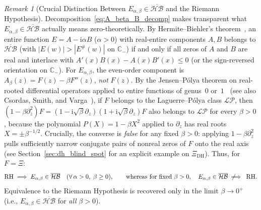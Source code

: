 \documentclass[11pt,reqno]{amsart}
\theoremstyle{definition}
\theoremstyle{remark}
\newtheorem{remark}[theorem]{Remark}
\numberwithin{equation}{section}
\newcommand{\C}{\mathbb{C}}
\newcommand{\ii}{\mathrm{i}}
\begin{document}
\begin{remark}[Crucial Distinction Between $E_{\alpha,\beta} \in \overline{\mathcal{HB}}$ and the Riemann Hypothesis]\label{rem:hb_weaker_than_rh}
Decomposition~\eqref{eq:A_beta_B_decomp} makes transparent what $E_{\alpha,\beta} \in \overline{\mathcal{HB}}$ actually means zero-theoretically. By Hermite--Biehler's theorem~\cite[Chapter~1]{debranges1968}, an entire function $E = A - \ii\alpha B$ ($\alpha > 0$) with real-entire components $A, B$ belongs to $\overline{\mathcal{HB}}$ (with $|E(w)| > |E^\#(w)|$ on $\C_-$) if and only if all zeros of $A$ and $B$ are real and interlace with $A'(x)B(x) - A(x)B'(x) \le 0$ (or the sign-reversed orientation on $\C_-$). For $E_{\alpha,\beta}$, the even-order component is $A_\beta(z) = F(z) - \beta F''(z)$, \emph{not} $F(z)$. By the Jensen--P\'olya theorem on real-rooted differential operators applied to entire functions of genus~$0$ or~$1$~\cite{jensen1913,polya1927} (see also Csordas, Smith, and Varga~\cite{csordassmithvarga1994}), if $F$ belongs to the Laguerre--P\'olya class $\mathcal{LP}$, then $(1 - \beta\partial_z^2)F = (1 - \ii\sqrt{\beta}\partial_z)(1 + \ii\sqrt{\beta}\partial_z)F$ also belongs to $\mathcal{LP}$ for every $\beta > 0$, because the polynomial $P(X) = 1 - \beta X^2$ applied to $\partial_z$ has real roots $X = \pm \beta^{-1/2}$. Crucially, the converse is \emph{false} for any fixed $\beta > 0$: applying $1 - \beta\partial_z^2$ pulls sufficiently narrow conjugate pairs of nonreal zeros of $F$ onto the real axis (see Section~\ref{sec:dh_blind_spot} for an explicit example on $\Xi_{\mathrm{DH}}$). Thus, for $F = \Xi$:
\[
\text{RH} \implies E_{\alpha,\beta} \in \overline{\mathcal{HB}} \quad (\forall\,\alpha > 0,\; \beta \ge 0), \qquad \text{whereas for fixed } \beta > 0,\quad E_{\alpha,\beta} \in \overline{\mathcal{HB}} \;\not\!\!\implies\; \text{RH}.
\]
Equivalence to the Riemann Hypothesis is recovered only in the limit $\beta \to 0^+$ (i.e., $E_{\alpha,\beta} \in \overline{\mathcal{HB}}$ for \emph{all} $\beta > 0$).
\end{remark}
\end{document}
